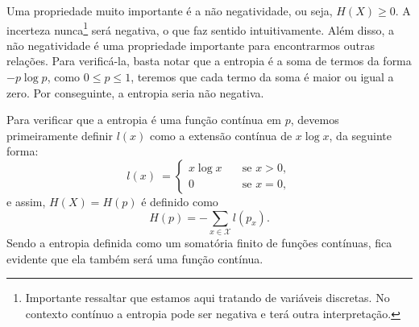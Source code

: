 Uma propriedade muito importante é a não negatividade, ou seja, $H(X) \geq 0$.
A incerteza nunca\footnote{Importante ressaltar que estamos aqui tratando de
    variáveis discretas. No contexto contínuo a entropia pode ser negativa e
    terá outra interpretação.} 
será negativa, o que faz sentido intuitivamente.  Além disso, a não
negatividade é uma propriedade importante para encontrarmos outras relações.
Para verificá-la, basta notar que a entropia é a soma de termos da forma $-p
\log p$, como $0 \leq p \leq 1$, teremos que cada termo da soma é maior ou
igual a zero. Por conseguinte, a entropia seria não negativa.

Para verificar que a entropia é uma função contínua em $p$, devemos primeiramente
definir $l(x)$ como a extensão contínua de $x \log x$, da seguinte forma:
\begin{equation}
l(x) \: = \begin{cases}
      x \log x & \quad \text{se } x > 0 , \\
      0        & \quad \text{se } x = 0 ,
      \end{cases}
\end{equation}
e assim, $H(X) = H(p)$ é definido como
\begin{equation}
H(p) = - \sum_{x \in \mathcal{X}} l(p_x) .
\end{equation}
Sendo a entropia definida como um somatória finito de funções contínuas,
fica evidente que ela também será uma função contínua.

